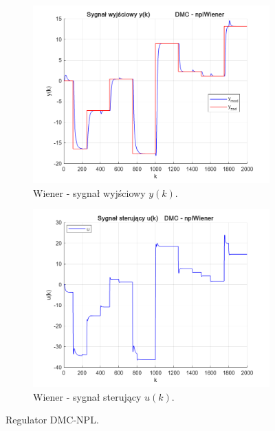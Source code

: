 \begin{figure}[b!]
\begin{subfigure}[b]{0.49\paperwidth}
\centering
\includegraphics[width=\linewidth]{pictures/y_nplWiener}
\caption{Wiener - sygnał wyjściowy $y(k)$.}
\end{subfigure}
\hfill
\begin{subfigure}[b]{0.49\paperwidth}
\centering
\includegraphics[width=\linewidth]{pictures/u_nplWiener}
\caption{Wiener - sygnał sterujący $u(k)$.}
\end{subfigure}

\caption{Regulator DMC-NPL.}
\end{figure}

\newpage

